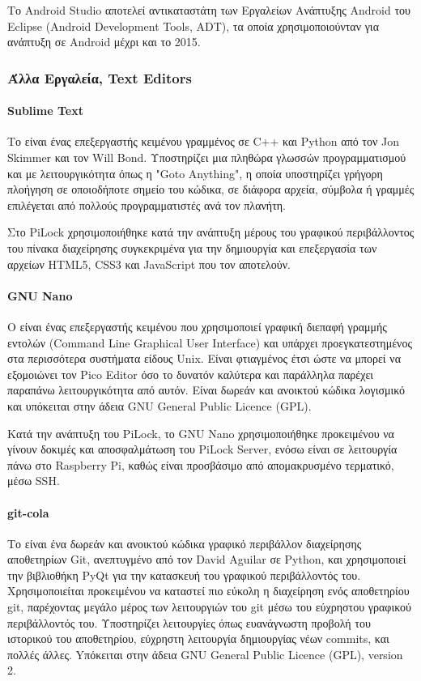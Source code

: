  			Το Android Studio αποτελεί αντικαταστάτη των Εργαλείων Ανάπτυξης Android του Eclipse (Android Development Tools, ADT), τα οποία χρησιμοποιούνταν για ανάπτυξη σε Android μέχρι και το 2015.

 		\subsubsection{Άλλα Εργαλεία, Text Editors}
 			\paragraph{Sublime Text}
 				Το  είναι ένας επεξεργαστής κειμένου γραμμένος σε C++ και Python από τον Jon Skimmer και τον Will Bond. Υποστηρίζει μια πληθώρα γλωσσών προγραμματισμού και με λειτουργικότητα όπως η "Goto Anything", η οποία υποστηρίζει γρήγορη πλοήγηση σε οποιοδήποτε σημείο του κώδικα, σε διάφορα αρχεία, σύμβολα ή γραμμές επιλέγεται από πολλούς προγραμματιστές ανά τον πλανήτη.

 				Στο PiLock χρησιμοποιήθηκε κατά την ανάπτυξη μέρους του γραφικού περιβάλλοντος του πίνακα διαχείρησης συγκεκριμένα για την δημιουργία και επεξεργασία των αρχείων HTML5, CSS3 και JavaScript που τον αποτελούν.

 			\paragraph{GNU Nano}
 				Ο  είναι ένας επεξεργαστής κειμένου που χρησιμοποιεί γραφική διεπαφή γραμμής εντολών (Command Line Graphical User Interface) και υπάρχει προεγκατεστημένος στα περισσότερα συστήματα είδους Unix. Είναι φτιαγμένος έτσι ώστε να μπορεί να εξομοιώνει τον Pico Editor όσο το δυνατόν καλύτερα και παράλληλα παρέχει παραπάνω λειτουργικότητα από αυτόν. Είναι δωρεάν και ανοικτού κώδικα λογισμικό και υπόκειται στην άδεια GNU General Public Licence (GPL).

 				Κατά την ανάπτυξη του PiLock, το GNU Nano χρησιμοποιήθηκε προκειμένου να γίνουν δοκιμές και αποσφαλμάτωση του PiLock Server, ενόσω είναι σε λειτουργία πάνω στο Raspberry Pi, καθώς είναι προσβάσιμο από απομακρυσμένο τερματικό, μέσω SSH.

 			\paragraph{git-cola}
 				Το  είναι ένα δωρεάν και ανοικτού κώδικα γραφικό περιβάλλον διαχείρησης αποθετηρίων Git, ανεπτυγμένο από τον David Aguilar σε Python, και χρησιμοποιεί την βιβλιοθήκη PyQt για την κατασκευή του γραφικού περιβάλλοντός του. Χρησιμοποιείται προκειμένου να καταστεί πιο εύκολη η διαχείρηση ενός αποθετηρίου git, παρέχοντας μεγάλο μέρος των λειτουργιών του git μέσω του εύχρηστου γραφικού περιβάλλοντός του. Υποστηρίζει λειτουργίες όπως ευανάγνωστη προβολή του ιστορικού του αποθετηρίου, εύχρηστη λειτουργία δημιουργίας νέων commits, και πολλές άλλες. Yπόκειται στην άδεια GNU General Public Licence (GPL), version 2.